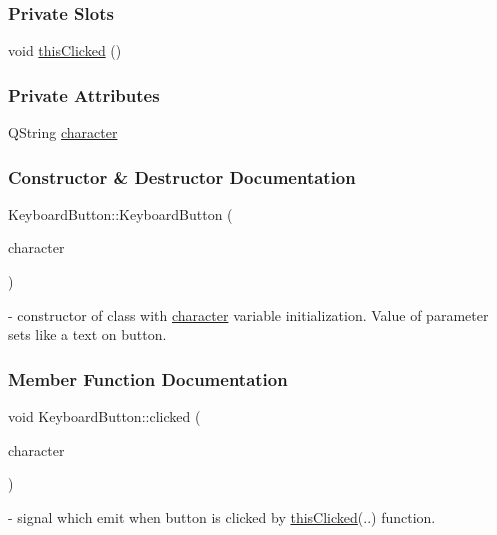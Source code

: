 \subsubsection*{Private Slots}
\begin{DoxyCompactItemize}
\item 
void \mbox{\hyperlink{classKeyboardButton_a518fc800cf7acf3b2a9614c7bfe74f93}{this\+Clicked}} ()
\end{DoxyCompactItemize}
\subsubsection*{Private Attributes}
\begin{DoxyCompactItemize}
\item 
Q\+String \mbox{\hyperlink{classKeyboardButton_a8979a4765bd83241a9a253211ec03774}{character}}
\end{DoxyCompactItemize}


\subsubsection{Constructor \& Destructor Documentation}
\mbox{\label{classKeyboardButton_ac2eac39f778e78dad45bac730e6a30bd}} 
{\footnotesize\ttfamily Keyboard\+Button\+::\texorpdfstring{Keyboard\+Button}{KeyboardButton} (\begin{DoxyParamCaption}\item[{Q\+String}]{character }\end{DoxyParamCaption})} - constructor of class with \hyperlink{classKeyboardButton_a8979a4765bd83241a9a253211ec03774}{character} variable initialization. Value of parameter sets like a text on button.

\subsubsection{Member Function Documentation}
\mbox{\label{classKeyboardButton_a6c6694c8330565de78f47f3c5fe11d06}} 
{\footnotesize\ttfamily void Keyboard\+Button\+::\texorpdfstring{clicked}{clicked} (\begin{DoxyParamCaption}\item[{Q\+String}]{character }\end{DoxyParamCaption}){\ttfamily [signal]}} - signal which emit when button is clicked by \hyperlink{classKeyboardButton_a518fc800cf7acf3b2a9614c7bfe74f93}{this\+Clicked}(..) function.

